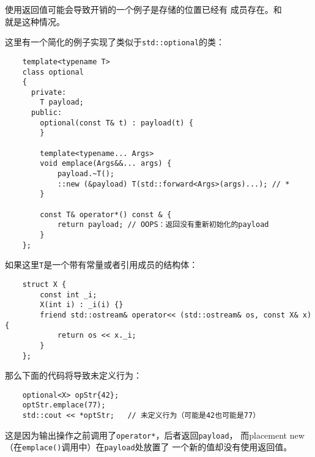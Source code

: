使用返回值可能会导致开销的一个例子是存储的位置已经有
成员存在。和\\就是这种情况。

这里有一个简化的例子实现了类似于\texttt{std::optional}的类：
\begin{lstlisting}
    template<typename T>
    class optional
    {
      private:
        T payload;
      public:
        optional(const T& t) : payload(t) {
        }

        template<typename... Args>
        void emplace(Args&&... args) {
            payload.~T();
            ::new (&payload) T(std::forward<Args>(args)...); // *
        }

        const T& operator*() const & {
            return payload; // OOPS：返回没有重新初始化的payload
        }
    };
\end{lstlisting}
如果这里\texttt{T}是一个带有常量或者引用成员的结构体：
\begin{lstlisting}
    struct X {
        const int _i;
        X(int i) : _i(i) {}
        friend std::ostream& operator<< (std::ostream& os, const X& x) {
            return os << x._i;
        }
    };
\end{lstlisting}
那么下面的代码将导致未定义行为：
\begin{lstlisting}
    optional<X> opStr{42};
    optStr.emplace(77);
    std::cout << *optStr;   // 未定义行为（可能是42也可能是77）
\end{lstlisting}
这是因为输出操作之前调用了\texttt{operator*}，后者返回\texttt{payload}，
而placement new（在\texttt{emplace()}调用中）在\texttt{payload}处放置了
一个新的值却没有使用返回值。

